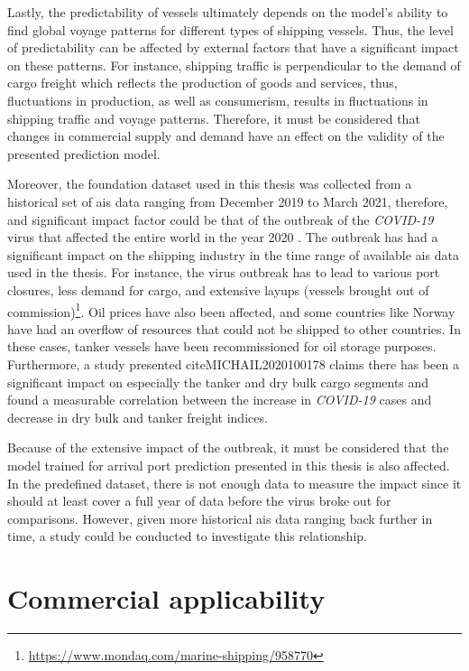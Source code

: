 Lastly, the predictability of vessels ultimately depends on the model's ability to find global voyage patterns for different types of shipping vessels. Thus, the level of predictability can be affected by external factors that have a significant impact on these patterns. For instance, shipping traffic is perpendicular to the demand of cargo freight which reflects the production of goods and services, thus, fluctuations in production, as well as consumerism, results in fluctuations in shipping traffic and voyage patterns. Therefore, it must be considered that changes in commercial supply and demand have an effect on the validity of the presented prediction model.

Moreover, the foundation dataset used in this thesis was collected from a historical set of \acrshort{ais} data ranging from December 2019 to March 2021, therefore, and significant impact factor could be that of the outbreak of the \textit{COVID-19} virus that affected the entire world in the year 2020 \parencite{covid_article}. The outbreak has had a significant impact on the shipping industry in the time range of available \acrshort{ais} data used in the thesis. For instance, the virus outbreak has to lead to various port closures, less demand for cargo, and extensive layups (vessels brought out of commission)\footnote{\url{https://www.mondaq.com/marine-shipping/958770}}. Oil prices have also been affected, and some countries like Norway have had an overflow of resources that could not be shipped to other countries. In these cases, tanker vessels have been recommissioned for oil storage purposes. Furthermore, a study presented cite{MICHAIL2020100178} claims there has been a significant impact on especially the tanker and dry bulk cargo segments and found a measurable correlation between the increase in \textit{COVID-19} cases and decrease in dry bulk and tanker freight indices.

Because of the extensive impact of the outbreak, it must be considered that the model trained for arrival port prediction presented in this thesis is also affected. In the predefined dataset, there is not enough data to measure the impact since it should at least cover a full year of data before the virus broke out for comparisons. However, given more historical \acrshort{ais} data ranging back further in time, a study could be conducted to investigate this relationship.

\section{Commercial applicability}

